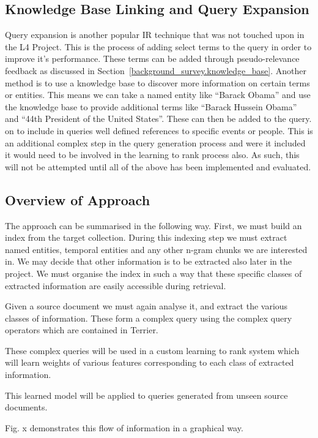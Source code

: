 \documentclass{mprop}
\begin{document}
\subsection{Knowledge Base Linking and Query Expansion}\label{proposed_approach.knowledge_base}
Query expansion is another popular IR technique that was not touched upon in the L4 Project. 
This is the process of adding select terms to the query in order to improve it's performance. 
These terms can be added through pseudo-relevance feedback as discussed in Section~\ref{background_survey.knowledge_base}.
Another method is to use a knowledge base to discover more information on certain terms or entities. 
This means we can take a named entity like ``Barack Obama'' and use the knowledge base to provide additional terms like ``Barack Hussein Obama'' and ``44th President of the United States''. 
These can then be added to the query. on to include in queries well defined references to specific events or people.
This is an additional complex step in the query generation process and were it included it would need to be involved in the learning to rank process also. 
As such, this will not be attempted until all of the above has been implemented and evaluated.

\subsection{Overview of Approach}\label{proposed_approach.overview}
The approach can be summarised in the following way.
First, we must build an index from the target collection. 
During this indexing step we must extract named entities, temporal entities and any other n-gram chunks we are interested in. 
We may decide that other information is to be extracted also later in the project.
We must organise the index in such a way that these specific classes of extracted information are easily accessible during retrieval.

Given a source document we must again analyse it, and extract the various classes of information.
These form a complex query using the complex query operators which are contained in Terrier.

These complex queries will be used in a custom learning to rank system which will learn weights of various features corresponding to each class of extracted information.

This learned model will be applied to queries generated from unseen source documents.

Fig. x demonstrates this flow of information in a graphical way.
\end{document}
